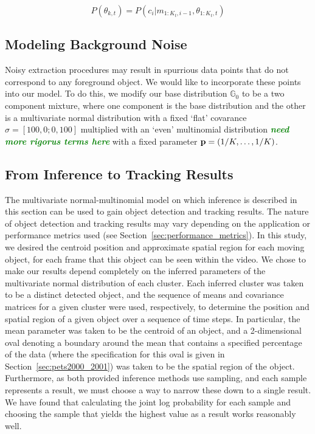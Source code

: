 \documentclass[smallcondensed, final]{svjour3}
\newcommand{\willie}[1]{\textcolor{green}{\textsf{\emph{\textbf{\textcolor{green}{#1}}}}}}
\begin{document}
\begin{equation}
P(\theta_{k,t}) = 	P(c_{i} | m_{1:K_{t}, i-1}, \theta_{1:K_{t}, t} )
\end{equation}



\subsection{Modeling Background Noise}

Noisy extraction procedures may result in spurrious data points that do not correspond to any foreground object. We would like to incorporate these points into our model. To do this, we modify our base distribution $\mathbb{G}_{0}$ to be a two component mixture, where one component is the base distribution and the other is a multivariate normal distribution with a fixed `flat' covarance $\sigma = [100, 0; 0, 100]$ multiplied with an `even' multinomial distribution \willie{need more rigorus terms here} with a fixed parameter $\bold{p} = (1/K, \ldots, 1/K)$.


\subsection{From Inference to Tracking Results}
\label{sec:inference_to_results}
The multivariate normal-multinomial model on which inference is described in this section can be used to gain object detection and tracking results. The nature of object detection and tracking results may vary depending on the application or performance metrics used (see Section~\ref{sec:performance_metrics}). In this study, we desired the centroid position and approximate spatial region for each moving object, for each frame that this object can be seen within the video. We chose to make our results depend completely on the inferred parameters of the multivariate normal distribution of each cluster. Each inferred cluster was taken to be a distinct detected object, and the sequence of means and covariance matrices for a given cluster were used, respectively, to determine the position and spatial region of a given object over a sequence of time steps. In particular, the mean parameter was taken to be the centroid of an object, and a 2-dimensional oval denoting a boundary around the mean that contains a specified percentage of the data (where the specification for this oval is given in Section~\ref{sec:pets2000_2001}) was taken to be the spatial region of the object. Furthermore, as both provided inference methods use sampling, and each sample represents a result, we must choose a way to narrow these down to a single result. We have found that calculating the joint log probability for each sample and choosing the sample that yields the highest value as a result works reasonably well.
\end{document}
